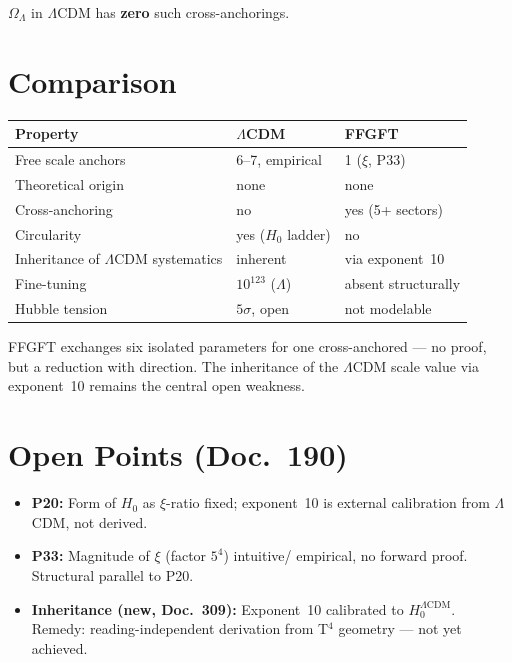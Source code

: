 $\Omega_\Lambda$ in $\Lambda$CDM has \textbf{zero} such cross-anchorings.

\chapter{Comparison}

\begin{center}
\begin{tabular}{lll}
\toprule
Property & $\Lambda$CDM & FFGFT \\
\midrule
Free scale anchors & 6--7, empirical & 1 ($\xi$, P33) \\
Theoretical origin & none & none \\
Cross-anchoring & no & yes (5+ sectors) \\
Circularity & yes ($H_0$ ladder) & no \\
Inheritance of $\Lambda$CDM systematics & inherent & via exponent~10 \\
Fine-tuning & $10^{123}$ ($\Lambda$) & absent structurally \\
Hubble tension & $5\sigma$, open & not modelable \\
\bottomrule
\end{tabular}
\end{center}

\medskip
FFGFT exchanges six isolated parameters for one cross-anchored —
no proof, but a reduction with direction. The inheritance of the
$\Lambda$CDM scale value via exponent~10 remains the central open
weakness.

\chapter{Open Points (Doc.~190)}

\begin{itemize}
  \item \textbf{P20:} Form of $H_0$ as $\xi$-ratio fixed; exponent~10
        is external calibration from $\Lambda$CDM, not derived.
  \item \textbf{P33:} Magnitude of $\xi$ (factor $5^4$) intuitive/
        empirical, no forward proof. Structural parallel to P20.
  \item \textbf{Inheritance (new, Doc.~309):} Exponent~10 calibrated
        to $H_0^{\Lambda\text{CDM}}$. Remedy: reading-independent
        derivation from T$^4$ geometry — not yet achieved.
\end{itemize}

